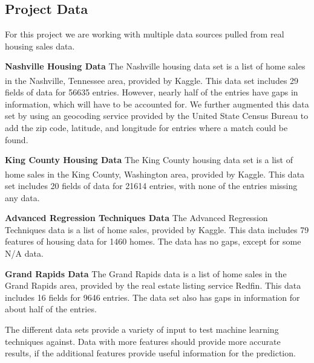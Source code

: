 \documentclass[10pt]{article}
\begin{document}
\begin{multicols}{2}
		\section{Project Data}
		For this project we are working with multiple data sources pulled from real housing sales data.
		\par
		\textbf{Nashville Housing Data} The Nashville housing data set is a list of home sales in the Nashville, Tennessee area, provided by Kaggle\textsuperscript{\cite{nashville_data}}. This data set includes 29 fields of data for 56635 entries. However, nearly half of the entries have gaps in information, which will have to be accounted for. We further augmented this data set by using an geocoding service provided by the United State Census Bureau to add the zip code, latitude, and longitude for entries where a match could be found.
		\par
		\textbf{King County Housing Data} The King County housing data set is a list of home sales in the King County, Washington area, provided by Kaggle\textsuperscript{\cite{kc_data}}. This data set includes 20 fields of data for 21614 entries, with none of the entries missing any data.
		\par
		\textbf{Advanced Regression Techniques Data} The Advanced Regression Techniques data is a list of home sales, provided by Kaggle. This data includes 79 features of housing data for 1460 homes. The data has no gaps, except for some N/A data.
		\par
		\textbf{Grand Rapids Data} The Grand Rapids data is a list of home sales in the Grand Rapids area, provided by the real estate listing service Redfin. This data includes 16 fields for 9646 entries. The data set also has gaps in information for about half of the entries.
		\par
		The different data sets provide a variety of input to test machine learning techniques against. Data with more features should provide more accurate results, if the additional features provide useful information for the prediction.

\end{multicols}
\end{document}
